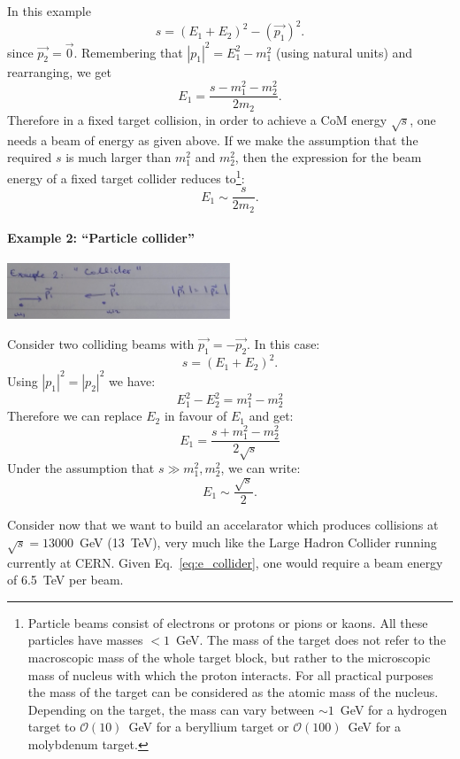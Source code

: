 In this example
\[
s=(E_{1}+E_{2})^{2}-(\vec{p_1})^2.
\]
since $\vec{p_2}=\vec{0}$. Remembering 
that $|p_1|^2=E_{1}^{2}-m_{1}^{2}$ (using natural units) and rearranging, we get
\[
E_{1}=\frac{s-m_{1}^{2}-m_{2}^{2}}{2m_{2}}.
\]
\noindent Therefore in a fixed target collision, in order to achieve a CoM 
energy $\sqrt{s}$, one needs a beam of energy as given above.  If we make the assumption that the required $s$ is much larger than $m_{1}^2$ and $m_{2}^{2}$, then the expression for the beam energy of a fixed target collider reduces to\footnote{Particle beams
consist of electrons or protons or pions or kaons. All these particles have masses $<1$~GeV.
The mass of the target does not refer to the macroscopic mass of the whole target block, but rather to the microscopic mass of nucleus with which the proton interacts. For all practical purposes the mass of the target can be considered as the atomic mass of the nucleus. Depending on the target, the mass can vary between $\sim 1$~GeV for a hydrogen target to $\mathcal{O}(10)$~GeV for a beryllium target or $\mathcal{O}(100)$~GeV for a molybdenum target.}:
\begin{equation}
\label{eq:e_fixed_target}
E_{1}\sim \frac{s}{2m_{2}}.
\end{equation}

\paragraph{Example 2: ``Particle collider''}
\begin{center}
\includegraphics[width=0.5\textwidth]{fig/collisions/collisions_example2.jpg}
\end{center}
Consider two colliding beams with $\vec{p_1}=-\vec{p_2}$.
In this case:
\[
s=(E_{1}+E_{2})^{2}.
\]
Using  $|p_1|^2=|p_2|^2$ we have:
\[
E_{1}^{2}-E_{2}^{2}=m_{1}^{2}-m_{2}^{2}
\]
Therefore we can replace $E_2$ in favour of $E_1$ and get:
\[
E_1=\frac{s+m_{1}^{2}-m_{2}^{2}}{2\sqrt{s}}
\]
Under the assumption that $s \gg m_{1}^2,m_{2}^2$, we can write:
\begin{equation}
\label{eq:e_collider}
E_{1}\sim \frac{\sqrt{s}}{2}.
\end{equation}

Consider now that we want to build an accelarator which produces collisions
at $\sqrt{s}=13$000~GeV (13~TeV), very much like the Large Hadron Collider running
currently at CERN. Given Eq.~\ref{eq:e_collider}, one would require a beam energy of 6.5~TeV per beam. 

